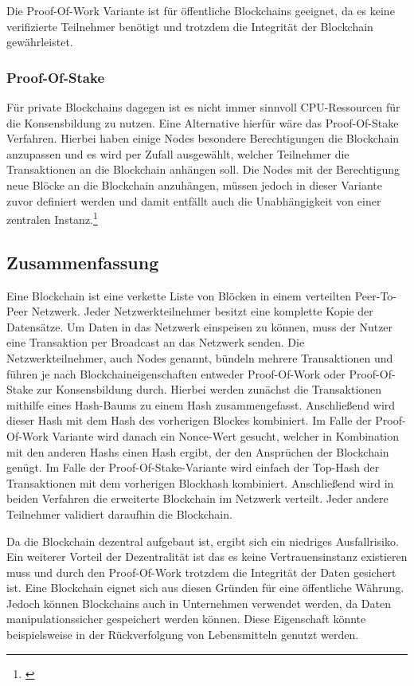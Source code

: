 Die Proof-Of-Work Variante ist für öffentliche Blockchains geeignet, da es keine verifizierte Teilnehmer benötigt und trotzdem die Integrität der Blockchain gewährleistet.

\subsubsection{Proof-Of-Stake}
\label{subsec:proofofstake}
Für private Blockchains dagegen ist es nicht immer sinnvoll CPU-Ressourcen für die Konsensbildung zu nutzen. Eine Alternative hierfür wäre das Proof-Of-Stake Verfahren. Hierbei haben einige Nodes besondere Berechtigungen die Blockchain anzupassen und es wird per Zufall ausgewählt, welcher Teilnehmer die Transaktionen an die Blockchain anhängen soll. Die Nodes mit der Berechtigung neue Blöcke an die Blockchain anzuhängen, müssen jedoch in dieser Variante zuvor definiert werden und damit entfällt auch die Unabhängigkeit von einer zentralen Instanz.\footnote{\cite[S.~315--316]{Neugebauer.2018}}

\subsection{Zusammenfassung}
Eine Blockchain ist eine verkette Liste von Blöcken in einem verteilten Peer-To-Peer Netzwerk. Jeder Netzwerkteilnehmer besitzt eine komplette Kopie der Datensätze. Um Daten in das Netzwerk einspeisen zu können, muss der Nutzer eine Transaktion per Broadcast an das Netzwerk senden. Die Netzwerkteilnehmer, auch Nodes genannt, bündeln mehrere Transaktionen und führen je nach Blockchaineigenschaften entweder Proof-Of-Work oder Proof-Of-Stake zur Konsensbildung durch. Hierbei werden zunächst die Transaktionen mithilfe eines Hash-Baums zu einem Hash zusammengefasst. Anschließend wird dieser Hash mit dem Hash des vorherigen Blockes kombiniert. Im Falle der Proof-Of-Work Variante wird danach ein Nonce-Wert gesucht, welcher in Kombination mit den anderen Hashs einen Hash ergibt, der den Ansprüchen der Blockchain genügt. Im Falle der Proof-Of-Stake-Variante wird einfach der Top-Hash der Transaktionen mit dem vorherigen Blockhash kombiniert. Anschließend wird in beiden Verfahren die erweiterte Blockchain im Netzwerk verteilt. Jeder andere Teilnehmer validiert daraufhin die Blockchain.

Da die Blockchain dezentral aufgebaut ist, ergibt sich ein niedriges Ausfallrisiko. Ein weiterer Vorteil der Dezentralität ist das es keine Vertrauensinstanz existieren muss und durch den Proof-Of-Work trotzdem die Integrität der Daten gesichert ist. Eine Blockchain eignet sich aus diesen Gründen für eine öffentliche Währung. Jedoch können Blockchains auch in Unternehmen verwendet werden, da Daten manipulationssicher gespeichert werden können. Diese Eigenschaft könnte beispielsweise in der Rückverfolgung von Lebensmitteln genutzt werden.